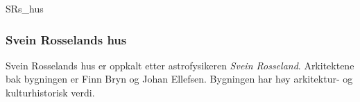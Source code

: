 \begin{uioimageframe}{SRs_hus}
  \frametitle{Svein Rosselands hus}

  Svein Rosselands hus er oppkalt etter astrofysikeren \emph{Svein
  Rosseland}. Arkitektene bak bygningen er Finn Bryn og Johan
  Ellefsen. Bygningen har høy arkitektur- og kulturhistorisk verdi.
\end{uioimageframe}
